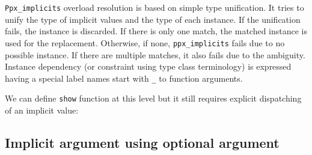 \documentclass{article}
\newenvironment{Shaded}{}{}
\newcommand{\KeywordTok}[1]{\textcolor[rgb]{0.00,0.22,0.06}{\textbf{{#1}}}}
\newcommand{\DataTypeTok}[1]{\textcolor[rgb]{0.28,0.06,0.00}{{#1}}}
\newcommand{\StringTok}[1]{\textcolor[rgb]{0.12,0.22,0.30}{{#1}}}
\newcommand{\CommentTok}[1]{\textcolor[rgb]{0.19,0.30,0.30}{\textit{{#1}}}}
\newcommand{\OtherTok}[1]{\textcolor[rgb]{0.00,0.22,0.06}{{#1}}}
\newcommand{\NormalTok}[1]{{#1}}
\begin{document}
\texttt{Ppx\_implicits} overload resolution is based on simple type
unification. It tries to unify the type of implicit values and the type
of each instance. If the unification fails, the instance is discarded.
If there is only one match, the matched instance is used for the
replacement. Otherwise, if none, \texttt{ppx\_implicits} fails due to no
possible instance. If there are multiple matches, it also fails due to
the ambiguity.
%
%  
%
Instance dependency (or constraint using type class terminology) is
expressed having a special label names start with \texttt{\_} to
function arguments.

We can define \texttt{show} function at this level but it still requires
explicit dispatching of an implicit value:

\begin{Shaded}
\end{Shaded}

\subsection{Implicit argument using optional
argument}\label{implicit-argument-using-optional-argument}
\end{document}
